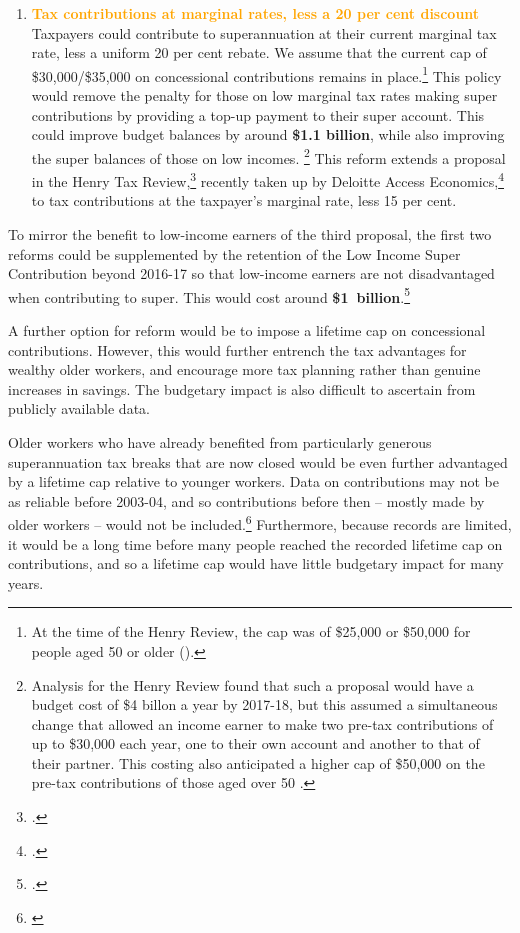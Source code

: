 \begin{enumerate}
\item 
\textcolor{Orange}{\textbf{Tax contributions at marginal rates, less a 20 per cent discount}} \quad
Taxpayers could contribute to superannuation at their current marginal tax rate, less a uniform 20 per cent rebate. We assume that the current cap of \$30,000/\$35,000 on concessional contributions remains in place.\footnote{At the time of the Henry Review, the cap was of \$25,000 or \$50,000 for people aged 50 or older (\textcite[][100]{HenryTaxReview2010}).}  This policy would remove the penalty for those on low marginal tax rates making super contributions by providing a top-up payment to their super account. This could improve budget balances by around \textbf{\$1.1 billion}, while also improving the super balances of those on low incomes.%
\footnote{Analysis for the Henry Review found that such a proposal would have a budget cost of \$4 billon a year by 2017-18, but this assumed a simultaneous change that allowed an income earner to make two pre-tax contributions of up to \$30,000 each year, one to their own account and another to that of their partner. This costing also anticipated a higher cap of \$50,000 on the pre-tax contributions of those aged over 50 \textcite{Treasury2010SuperAdditionalMaterial} \textcite[][95]{HenryTaxReview2010}.}  
This reform extends a proposal in the Henry Tax Review,\footcite[][102]{Treasury2010IGR}  recently taken up by Deloitte Access Economics,\footcite{Deloitte2015TaxReformSheddingLight}  to tax contributions at the taxpayer’s marginal rate, less 15 per cent.
\end{enumerate}

To mirror the benefit to low-income earners of the third proposal, the first two reforms could be supplemented by the retention of the Low Income Super Contribution beyond 2016-17 so that low-income earners are not disadvantaged when contributing to super. This would cost around \textbf{\$1~billion}.\footcite[][Table~2.16, p.~206]{Treasury2013PortfolioBudgetStatement1314}

A further option for reform would be to impose a lifetime cap on concessional contributions. However, this would further entrench the tax advantages for wealthy older workers, and encourage more tax planning rather than genuine increases in savings. The budgetary impact is also difficult to ascertain from publicly available data. 

Older workers who have already benefited from particularly generous superannuation tax breaks that are now closed would be even further advantaged by a lifetime cap relative to younger workers. Data on contributions may not be as reliable before 2003-04, and so contributions before then – mostly made by older workers – would not be included.\footnote{\textcites{SuperContrTaxRegs1997}{ATO2003}{ATO2008}{ATO2014g}{ATO2014h}} Furthermore, because records are limited, it would be a long time before many people reached the recorded lifetime cap on contributions, and so a lifetime cap would have little budgetary impact for many years.

